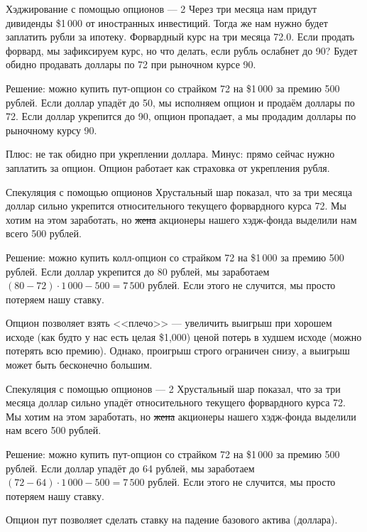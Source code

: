 \documentclass{beamer}
\begin{document}
\begin{frame}{Хэджирование с помощью опционов --- 2}
\justify
Через три месяца нам придут дивиденды \$1\,000 от иностранных инвестиций. Тогда же нам нужно будет заплатить рубли за ипотеку. Форвардный курс на три месяца 72.0. Если продать форвард, мы зафиксируем курс, но что делать, если рубль ослабнет до 90? Будет обидно продавать доллары по 72 при рыночном курсе 90.

\justify
Решение: можно купить пут-опцион со страйком 72 на \$1\,000 за премию 500 рублей. Если доллар упадёт до 50, мы исполняем опцион и продаём доллары по 72. Если доллар укрепится до 90, опцион пропадает, а мы продадим доллары по рыночному курсу 90.

\justify
Плюс: не так обидно при укреплении доллара. Минус: прямо сейчас нужно заплатить за опцион. Опцион работает как страховка от укрепления рубля.
\end{frame}



\begin{frame}{Спекуляция с помощью опционов}
\justify
Хрустальный шар показал, что за три месяца доллар сильно укрепится относительного текущего форвардного курса 72. Мы хотим на этом заработать, но \sout{жена} акционеры нашего хэдж-фонда выделили нам всего 500 рублей.

\justify
Решение: можно купить колл-опцион со страйком 72 на \$1\,000 за премию 500 рублей. Если доллар укрепится до 80 рублей, мы заработаем $(80 - 72) \cdot 1\,000 - 500 = 7\,500$ рублей. Если этого не случится, мы просто потеряем нашу ставку.

\justify
Опцион позволяет взять <<плечо>> --- увеличить выигрыш при хорошем исходе (как будто у нас есть целая \$1,000) ценой потерь в худшем исходе (можно потерять всю премию). Однако, проигрыш строго ограничен снизу, а выигрыш может быть бесконечно большим.
\end{frame}



\begin{frame}{Спекуляция с помощью опционов --- 2}
\justify
Хрустальный шар показал, что за три месяца доллар сильно упадёт относительного текущего форвардного курса 72. Мы хотим на этом заработать, но \sout{жена} акционеры нашего хэдж-фонда выделили нам всего 500 рублей.

\justify
Решение: можно купить пут-опцион со страйком 72 на \$1\,000 за премию 500 рублей. Если доллар упадёт до 64 рублей, мы заработаем $(72 - 64) \cdot 1\,000 - 500 = 7\,500$ рублей. Если этого не случится, мы просто потеряем нашу ставку.

\justify
Опцион пут позволяет сделать ставку на падение базового актива (доллара).
\end{frame}
\end{document}
